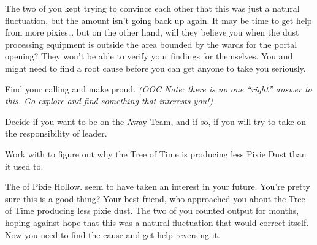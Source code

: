 \documentclass[char]{PP}
\begin{document}
The two of you kept trying to convince each other that this was just a natural fluctuation, but the amount isn’t going back up again. It may be time to get help from more pixies… but on the other hand, will they believe you when the dust processing equipment is outside the area bounded by the wards for the portal opening? They won’t be able to verify your findings for themselves. You and \cMTree{} might need to find a root cause before you can get anyone to take you seriously.
 

\begin{itemz}
	\item Find your calling and make \cSHead{} proud. \textit{(OOC Note: there is no one ``right'' answer to this. Go explore and find something that interests you!)}
	\item Decide if you want to be on the Away Team, and if so, if you will try to take on the responsibility of leader.
	\item Work with \cMTree{} to figure out why the Tree of Time is producing less Pixie Dust than it used to.
\end{itemz}

\begin{contacts}
	\contact{\cSHead{}} The \cSHead{\Majesty} of Pixie Hollow. \cSHead{\They} seem\cSHead{\plural} to have taken an interest in your future. You’re pretty sure this is a good thing?
	\contact{\cMTree{}} Your best friend, who approached you about the Tree of Time producing less pixie dust. The two of you counted output for months, hoping against hope that this was a natural fluctuation that would correct itself. Now you need to find the cause and get help reversing it.
\end{contacts}
\end{document}

